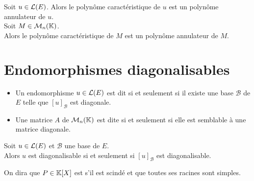\documentclass[a4paper]{book}
\begin{document}
\begin{Theoreme}
Soit $u\in \mathcal{L}(E)$.
Alors le polynôme caractéristique de $u$ est un polynôme annulateur de $u$.\\
Soit $M\in \mathcal{M}_{n}(\mathbb{K})$.\\
Alors le polynôme caractéristique de $M$ est un polynôme annulateur de $M$.\\
\end{Theoreme}
\section{Endomorphismes diagonalisables}

\begin{Definition}[Diagonalisable]
\begin{itemize}
\item Un endomorphisme $u\in \mathcal{L}(E)$ est dit  si et seulement si
  il existe une base $\mathcal{B} $ de $E$ telle que $[u]_\mathcal{B} $ est diagonale.
\item Une matrice $A$ de $\mathcal{M}_{n}(\mathbb{K})$ est dite  si et seulement si
  elle est semblable à une matrice diagonale.
\end{itemize}
\end{Definition}
\begin{Proposition}
Soit $u\in \mathcal{L}(E)$ et $\mathcal{B} $ une base de $E$.\\
Alors $u$ est diagonalisable si et seulement si $[u]_\mathcal{B} $ est diagonalisable.
\end{Proposition}
\begin{Definition}
On dira que $P\in \mathbb{K} [X]$ est  s'il est scindé et que toutes ses racines sont simples.
\end{Definition}
\end{document}
